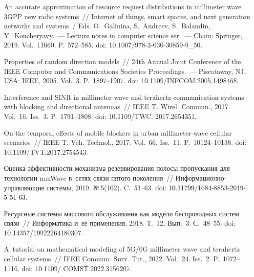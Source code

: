 \begin{multicols}{2}
{{\begin{thebibliography}{9}
 An accurate 
approximation of resource request distributions in millimeter wave 3GPP new 
radio systems~// Internet of things, smart spaces, and next generation networks 
and systems~/ Eds. O.~Galinina, S.~Andreev, S.~Balandin, Y.~Koucheryavy.~--- 
Lecture notes in computer science ser.~--- Cham: Springer, 2019. Vol.~11660. 
P.~572--585. doi: 10.1007/978-3-030-30859-9\_50.

 Properties of random direction 
models~//  24th Annual Joint Conference of the IEEE Computer and 
Communications Societies Proceedings.~--- Piscataway, NJ, USA: IEEE, 2005. Vol.~3. P.~1897--1907. 
doi: 10.1109/INFCOM.2005.1498468. 

\newblock Interference and SINR in millimeter wave and terahertz communication 
systems with blocking and directional antennas~// IEEE T. Wirel. 
Commun., 2017. Vol.~16. Iss.~3. P.~1791--1808. doi: 
10.1109/TWC. 2017.2654351.

 On the temporal 
effects of mobile blockers in urban millimeter-wave cellular scenarios~// IEEE 
T. Veh. Technol., 2017. Vol.~66. Iss.~11. P.~10124--10138. 
doi: 10.1109/TVT.2017.2754543.

 Оценка эф\-фек\-тив\-ности механизма резервирования 
полосы про\-пус\-ка\-ния для технологии mmWave в~сетях связи пятого поколения~// 
Ин\-фор\-ма\-ци\-он\-но-управ\-ля\-ющие сис\-те\-мы, 2019. №\,5(102). C.~51--63. doi: 
10.31799/1684-8853-2019-5-51-63.

\pagebreak

Ресурсные
сис\-те\-мы массового обслуживания как модели беспроводных сис\-тем связи~// 
Информатика и~её применения, 2018. Т.~12. Вып.~3. С.~48--55. doi: 
10.14357/19922264180307.

 A~tutorial on mathematical modeling of 5G/6G millimeter wave and 
terahertz cellular systems~// IEEE Commun. Surv. Tut., 2022. 
Vol.~24. Iss.~2. P.~1072--1116. doi: 10.1109/ COMST.2022.3156207.


\end{thebibliography}

 }
 }

\end{multicols}

